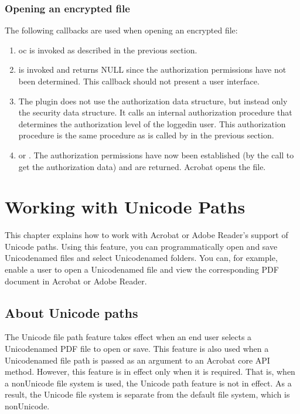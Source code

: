\documentclass[letterpaper,12pt,english,openany,oneside]{sphinxmanual}
\begin{document}
\subsection{Opening an encrypted file}
\label{\detokenize{Plugins_Security:opening-an-encrypted-file}}
The following callbacks are used when opening an encrypted file:
\begin{enumerate}
%
\item {} 
 oc is invoked as described in the previous section.

\item {} 
 is invoked and returns NULL since the authorization permissions have not been determined. This callback should not present a user interface.

\item {} 
The plugin does not use the authorization data structure, but instead only the security data structure. It calls an internal authorization procedure that determines the authorization level of the logged\sphinxhyphen{}in user. This authorization procedure is the same procedure as is called by  in the previous section.

\item {} 
 or . The authorization permissions have now been established (by the call to get the authorization data) and are returned. Acrobat opens the file.

\end{enumerate}


\chapter{Working with Unicode Paths}
\label{\detokenize{Plugins_Unicode:working-with-unicode-paths}}\label{\detokenize{Plugins_Unicode::doc}}
This chapter explains how to work with Acrobat or Adobe Reader’s support of Unicode paths. Using this feature, you can programmatically open and save Unicode\sphinxhyphen{}named files and select Unicode\sphinxhyphen{}named folders. You can, for example, enable a user to open a Unicode\sphinxhyphen{}named file and view the corresponding PDF document in Acrobat or Adobe Reader.


\section{About Unicode paths}
\label{\detokenize{Plugins_Unicode:about-unicode-paths}}
The Unicode file path feature takes effect when an end user selects a Unicode\sphinxhyphen{}named PDF file to open or save. This feature is also used when a Unicode\sphinxhyphen{}named file path is passed as an argument to an Acrobat core API method. However, this feature is in effect only when it is required. That is, when a non\sphinxhyphen{}Unicode file system is used, the Unicode path feature is not in effect. As a result, the Unicode file system is separate from the default file system, which is non\sphinxhyphen{}Unicode.
\end{document}
